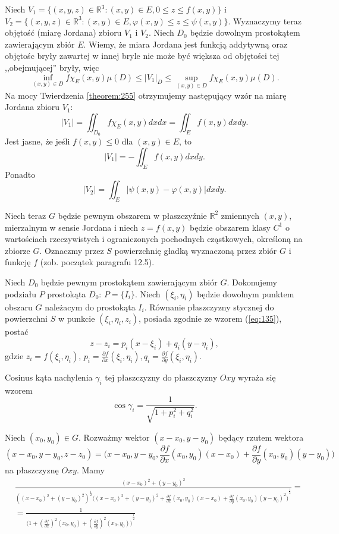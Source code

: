 \documentclass[leqno]{article}
\begin{document}
\begin{justify}
Niech $V_1 = \{(x,y,z) \in \mathbb{R}^3 : (x,y) \in E, 0 \leqslant z \leqslant f(x,y)\}$ i $V_2 = \{(x,y,z) \in \mathbb{R}^3 : (x,y) \in E, \varphi(x,y) \leqslant z \leqslant \psi(x,y)\}$.
Wyznaczymy teraz objętość (miarę Jordana) zbioru $V_1$ i $V_2$. Niech $D_0$ będzie dowolnym prostokątem zawierającym zbiór $E$.
Wiemy, że miara Jordana jest funkcją addytywną oraz objętośc bryły zawartej w innej bryle nie może być większa od objętości tej ,,obejmującej'' bryły, więc 
\[
    \inf_{(x,y) \in D}f \chi_E(x,y)\mu(D) \leqslant |V_1|_D \leqslant \sup_{(x,y) \in D}f \chi_E(x,y)\mu(D).
\]
Na mocy Twierdzenia \ref{theorem:255} otrzymujemy następujący wzór na miarę Jordana zbioru $V_1$:
\[
    |V_1| = \iint_{D_0}f \chi_E(x,y)dxdx = \iint_{E}f(x,y)dxdy.
\]
Jest jasne, że jeśli $f(x,y) \leqslant 0$ dla $(x,y) \in E$, to 
\[
    |V_1| = - \iint_{E}f(x,y)dxdy.
\]
Ponadto 
\[
    |V_2| = \iint_{E}|\psi(x,y) - \varphi(x,y)|dxdy.
\]

Niech teraz $G$ będzie pewnym obszarem w płaszczyźnie $\mathbb{R}^2$ zmiennych $(x,y)$, mierzalnym w sensie Jordana 
i niech $z = f(x,y)$ będzie obszarem klasy $C^1$ o wartościach rzeczywistych i ograniczonych pochodnych cząstkowych, 
określoną na zbiorze $G$. Oznaczmy przez $S$ powierzchnię gładką wyznaczoną przez zbiór $G$ i funkcję $f$ (zob. początek paragrafu 12.5).

Niech $D_0$ będzie pewnym prostokątem zawierającym zbiór $G$. Dokonujemy podziału $P$ prostokąta $D_0$: $P = \{I_i\}$.
Niech $(\xi_i, \eta_i)$ będzie dowolnym punktem obszaru $G$ należacym do prostokąta $I_i$. Równanie płaszczyzny stycznej do powierzchni $S$
w punkcie $(\xi_i, \eta_i, z_i)$, posiada zgodnie ze wzorem (\ref{eq:135}), postać 
\begin{equation}\label{eq:184}
    z - z_i = p_i(x - \xi_i) + q_i(y - \eta_i),
\end{equation}
gdzie $z_i = f(\xi_i, \eta_i)$, $p_i = \frac{\partial f}{\partial x}(\xi_i, \eta_i), q_i = \frac{\partial f}{\partial y}(\xi_i, \eta_i)$.

Cosinus kąta nachylenia $\gamma_i$ tej płaszczyzny do płaszczyzny $Oxy$ wyraża się wzorem 
\[
    \cos \gamma_i = \frac{1}{\sqrt{1 + p_i^2 + q_i^2}}.
\]

Niech $(x_0, y_0) \in G$. Rozważmy wektor $(x-x_0, y-y_0)$ będący rzutem wektora 
\[
    (x-x_0, y-y_0, z-z_0) = \Big(x-x_0, y-y_0, \frac{\partial f}{\partial x}(x_0, y_0)(x - x_0) + \frac{\partial f}{\partial y}(x_0, y_0)(y-y_0)\Big)
\]
na płaszczyznę $Oxy$. Mamy 
\[
    \begin{aligned}
       & \frac{{(x-x_0)}^2 + {(y-y_0)^2}}{{{({(x-x_0)}^2 + {(y-y_0)^2})}^\frac{1}{2}\Big({(x-x_0)}^2 + {(y-y_0)^2} + {\frac{\partial f}{\partial x}(x_0, y_0)(x - x_0) + \frac{\partial f}{\partial y}(x_0, y_0)(y-y_0)}^2\Big)}^\frac{1}{2}} = \\
       & = \frac{1}{{\Big(1 + {(\frac{\partial f}{\partial x})}^2 (x_0,y_0) + {(\frac{\partial f}{\partial y})}^2 (x_0, y_0)\Big)}^\frac{1}{2}}
    \end{aligned}
\]


\end{justify}
\end{document}
